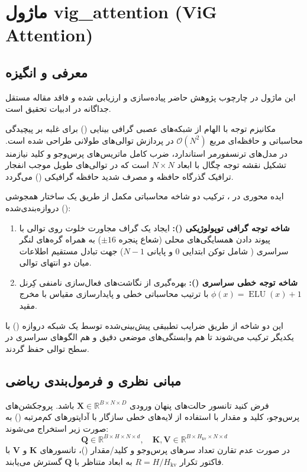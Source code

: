 \section{ماژول vig\_attention (ViG Attention)}
\label{sec:module_vig_attention}

\subsection{معرفی و انگیزه}
این ماژول در چارچوب پژوهش حاضر پیاده‌سازی و ارزیابی شده و فاقد مقاله مستقل جداگانه در ادبیات تحقیق است.

مکانیزم توجه  با الهام از شبکه‌های عصبی گرافی بینایی () برای غلبه بر پیچیدگی محاسباتی و حافظه‌ای مربع $\mathcal{O}(N^2)$ در پردازش توالی‌های طولانی طراحی شده است. در مدل‌های ترنسفورمر استاندارد، ضرب کامل ماتریس‌های پرس‌وجو و کلید نیازمند تشکیل نقشه توجه چگال با ابعاد $N \times N$ است که در توالی‌های طویل موجب انفجار ترافیک گذرگاه حافظه و مصرف شدید حافظه گرافیکی () می‌گردد.

ایده محوری در ، ترکیب دو شاخه محاسباتی مکمل از طریق یک ساختار همجوشی دروازه‌بندی‌شده ():
\begin{enumerate}
    \item \textbf{شاخه توجه گرافی توپولوژیکی ():} ایجاد یک گراف مجاورت خلوت روی توالی با پیوند دادن همسایگی‌های محلی (شعاع پنجره $\pm 16$) به همراه گره‌های لنگر سراسری ( شامل توکن ابتدایی $0$ و پایانی $N-1$) جهت تبادل مستقیم اطلاعات میان دو انتهای توالی.
    \item \textbf{شاخه توجه خطی سراسری ():} بهره‌گیری از نگاشت‌های فعال‌سازی نامنفی کِرنل $\phi(x) = \operatorname{ELU}(x) + 1$ با ترتیب محاسباتی خطی و پایدارسازی مقیاس با مخرج مقید.
\end{enumerate}
این دو شاخه از طریق ضرایب تطبیقی پیش‌بینی‌شده توسط یک شبکه دروازه () با یکدیگر ترکیب می‌شوند تا هم وابستگی‌های موضعی دقیق و هم الگوهای سراسری در سطح توالی حفظ گردند.

\subsection{مبانی نظری و فرمول‌بندی ریاضی}
فرض کنید تانسور حالت‌های پنهان ورودی $\mathbf{X} \in \mathbb{R}^{B \times N \times D}$ باشد. پروجکشن‌های پرس‌وجو، کلید و مقدار با استفاده از لایه‌های خطی سازگار با آداپتورهای کم‌مرتبه () به صورت زیر استخراج می‌شوند:
\begin{equation}
\mathbf{Q} \in \mathbb{R}^{B \times H \times N \times d}, \quad \mathbf{K}, \mathbf{V} \in \mathbb{R}^{B \times H_{\text{kv}} \times N \times d}
\end{equation}
در صورت عدم تقارن تعداد سرهای پرس‌وجو و کلید/مقدار ()، تانسورهای $\mathbf{K}$ و $\mathbf{V}$ با فاکتور تکرار $R = H / H_{\text{kv}}$ به ابعاد متناظر با $\mathbf{Q}$ گسترش می‌یابند.

